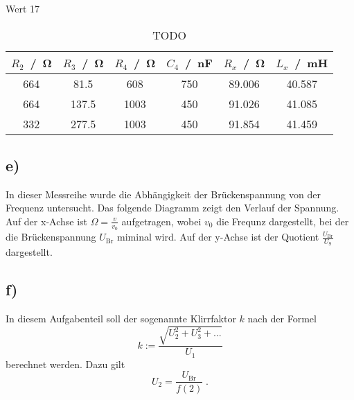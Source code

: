 Wert 17

\begin{table}
  \centering
  \caption{TODO}
  \label{tab:todo4}
  \begin{tabular}{c c c c c c}
    \toprule
    $R_2$ \,/\, \si{\ohm} &
    $R_3$ \,/\, \si{\ohm} &
    $R_4$ \,/\, \si{\ohm} &
    $C_4$ \,/\, \si{\nano\farad} &
    $R_x$ \,/\, \si{\ohm} &
    $L_x$ \,/\, \si{\milli\henry} \\
    \midrule
    664	&  81.5	& 608  & 750 & 89.006 & 40.587  \\
    664	& 137.5	& 1003 & 450 & 91.026 & 41.085  \\
    332	& 277.5	& 1003 & 450 & 91.854 & 41.459  \\
    \bottomrule
  \end{tabular}
\end{table}

\subsection{e)}
In dieser Messreihe wurde die Abhängigkeit der Brückenspannung von der Frequenz untersucht.
Das folgende Diagramm zeigt den Verlauf der Spannung.
Auf der x-Achse ist $\Omega = \frac{v}{v_0}$ aufgetragen, wobei $v_0$ die Frequnz dargestellt, bei
der die Brückenspannung $U_\text{Br}$ miminal wird.
Auf der y-Achse ist der Quotient $\frac{U_\text{Br}}{U_\text{S}}$ dargestellt.


\subsection{f)}
In diesem Aufgabenteil soll der sogenannte Klirrfaktor $k$ nach der Formel
\begin{equation}
     k := \frac{\sqrt{U_2^2 + U_3^2 + ...}}{U_1}
\end{equation}
berechnet werden.
Dazu gilt
\begin{equation}
    U_2 = \frac{U_\text{Br}}{f(2)} \; .
\end{equation}
